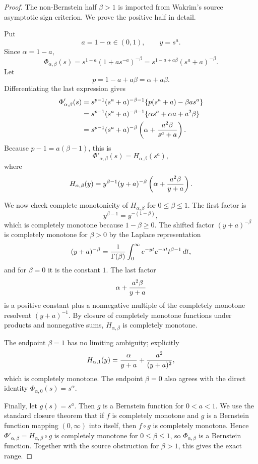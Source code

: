 \documentclass[11pt]{article}
\numberwithin{equation}{section}
\theoremstyle{definition}
\theoremstyle{remark}
\newcommand{\1}{\mathbf 1}
\begin{document}
\begin{proof}
The non-Bernstein half \(\beta>1\) is imported from Wakrim's source
asymptotic sign criterion.  We prove the positive half in detail.

Put
\[
  a=1-\alpha\in(0,1),\qquad y=s^a .
\]
Since \(\alpha=1-a\),
\[
 \Phi_{\alpha,\beta}(s)
 =s^{1-a}(1+a s^{-a})^{-\beta}
 =s^{1-a+a\beta}(s^a+a)^{-\beta}.
\]
Let
\[
  p=1-a+a\beta=\alpha+a\beta .
\]
Differentiating the last expression gives
\[
\begin{aligned}
 \Phi'_{\alpha,\beta}(s)
 &=s^{p-1}(s^a+a)^{-\beta-1}
     \{p(s^a+a)-\beta a s^a\}  \\
 &=s^{p-1}(s^a+a)^{-\beta-1}
     \{\alpha s^a+\alpha a+a^2\beta\}       \\
 &=s^{p-1}(s^a+a)^{-\beta}
     \left(\alpha+{a^2\beta\over s^a+a}\right).
\end{aligned}
\]
Because \(p-1=a(\beta-1)\), this is
\[
  \Phi'_{\alpha,\beta}(s)=H_{\alpha,\beta}(s^a),
\]
where
\[
 H_{\alpha,\beta}(y)
 =y^{\beta-1}(y+a)^{-\beta}
      \left(\alpha+{a^2\beta\over y+a}\right).
\]

We now check complete monotonicity of \(H_{\alpha,\beta}\) for
\(0\le\beta\le1\).  The first factor is
\[
  y^{\beta-1}=y^{-(1-\beta)},
\]
which is completely monotone because \(1-\beta\ge0\).  The shifted factor
\((y+a)^{-\beta}\) is completely monotone for \(\beta>0\) by the Laplace
representation
\[
 (y+a)^{-\beta}
 ={1\over\Gamma(\beta)}
   \int_0^\infty e^{-yt}e^{-at}t^{\beta-1}\,dt,
\]
and for \(\beta=0\) it is the constant \(1\).  The last factor
\[
  \alpha+{a^2\beta\over y+a}
\]
is a positive constant plus a nonnegative multiple of the completely monotone
resolvent \((y+a)^{-1}\).  By closure of completely monotone functions under
products and nonnegative sums, \(H_{\alpha,\beta}\) is completely monotone.

The endpoint \(\beta=1\) has no limiting ambiguity; explicitly
\[
 H_{\alpha,1}(y)
 ={\alpha\over y+a}+{a^2\over (y+a)^2},
\]
which is completely monotone.  The endpoint \(\beta=0\) also agrees with the
direct identity \(\Phi_{\alpha,0}(s)=s^\alpha\).

Finally, let \(g(s)=s^a\).  Then \(g\) is a Bernstein function for \(0<a<1\).
We use the standard closure theorem that if \(f\) is completely monotone and
\(g\) is a Bernstein function mapping \((0,\infty)\) into itself, then
\(f\circ g\) is completely monotone.  Hence
\(\Phi'_{\alpha,\beta}=H_{\alpha,\beta}\circ g\) is completely monotone for
\(0\le\beta\le1\), so \(\Phi_{\alpha,\beta}\) is a Bernstein function.
Together with the source obstruction for \(\beta>1\), this gives the exact
range.
\end{proof}
\end{document}

